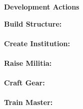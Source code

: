 \documentclass[12pt]{extarticle}
\begin{document}
    \newpage
    \begin{center}\huge \textbf{Development Actions} \end{center}
    \large \textbf{Build Structure:}
    \small\paragraph{}\par
    \bigskip
    \noindent\large \textbf{Create Institution:}
    \small\paragraph{}\par
    \bigskip
    \noindent\large \textbf{Raise Militia:}
    \small\paragraph{}\par
    \bigskip
    \noindent\large \textbf{Craft Gear:}
    \small\paragraph{}\par
    \bigskip
    \noindent\large \textbf{Train Master:}
    \small\paragraph{}\par
    \bigskip
\end{document}
